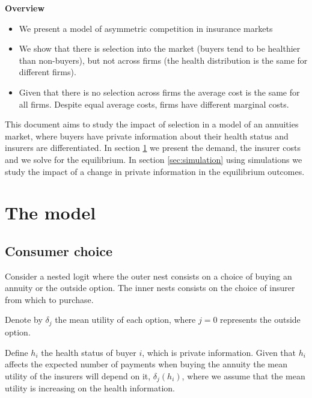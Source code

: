 \documentclass[12pt]{article}
\theoremstyle{plain}
\theoremstyle{plain}
\begin{document}
\textbf{Overview}

\begin{itemize}
    \item We present a model of asymmetric competition in insurance markets 
    \item We show that there is selection into the market (buyers tend to be healthier than non-buyers), but not across firms (the health distribution is the same for different firms). 
    \item Given that there is no selection across firms the average cost is the same for all firms. Despite equal average costs, firms have different marginal costs. 
\end{itemize}


\hline

\medskip

This document aims to study the impact of selection in a model of an annuities market, where buyers have private information about their health status and insurers are differentiated. 
In section \ref{sec:model} we present the demand, the insurer costs and we solve for the equilibrium. In section \ref{sec:simulation} using simulations we study the impact of a change in private information in the equilibrium outcomes. 





\section{The model}\label{sec:model}
\subsection{Consumer choice}\label{sec:consumer_choice}

Consider a nested logit where the outer nest consists on a choice of buying an annuity or the outside option. The inner nests consists on the choice of insurer from which to purchase. 

Denote by $\delta_j$ the mean utility of each option, where $j =0$ represents the outside option. 

Define $h_i$ the health status of buyer $i$, which is private information. Given that $h_i$ affects the expected number of payments when buying the annuity the mean utility of the insurers will depend on it, $\delta_j(h_i)$, where we assume that the mean utility is increasing on the health information. 
\end{document}
